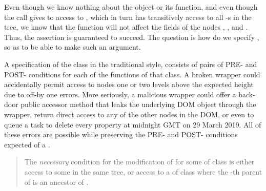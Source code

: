 Even though we know nothing about the  object or
its  function, and even though the call gives
to  access to , which in turn has transitively
access to all -s in the tree, we know that %
the  function will not
affect the  fields of the nodes , ,
and .  Thus, the assertion is guaranteed to
succeed.  The question is how do we specify , so as to be
able to make such an argument. %

A specification of the class  in the traditional
style, \eg \cite{Leavens-etal07} 
consists of pairs of PRE- and POST- conditions for each of the
functions of that class. 
A broken
wrapper could accidentally permit access to nodes one or two levels
above the expected height due to off-by one errors. More seriously,
a malicious wrapper could offer a
back-door public accessor method that leaks the underlying DOM
object through the wrapper, return direct access to any of the
other nodes in the DOM, or even to queue a task to
delete every property at midnight GMT on 29 March 2019. All of these errors are possible while
preserving the PRE- and POST- conditions expected of a . 

\begin{quote}
The \emph{necessary} condition for the modification of  for some  of class   is either access to some    in the same tree, or  access to a  of class  where the -th parent of  is an ancestor of .
\end{quote}

